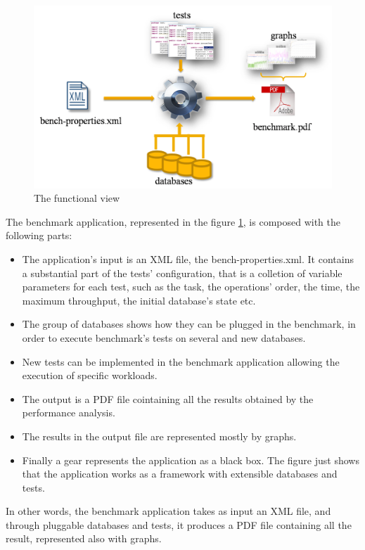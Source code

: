 \begin{figure}[htp!] 
	\begin{center}
		\includegraphics[width=13cm]{img/diagramma-specifiche.png}	
	\end{center}
	\caption{The functional view}
	\label{system-external-view}	
\end{figure}

The benchmark application, represented in the figure \ref{system-external-view}, is composed with the following parts:
\begin{itemize}
	\item The application's input is an XML file, the bench-properties.xml. It contains a substantial part of the tests' configuration, that is a colletion of variable parameters for each test, such as the task, the operations' order, the time, the maximum throughput, the initial database's state etc.
	\item The group of databases shows how they can be plugged in the benchmark, in order to execute benchmark's tests on several and new databases.
	\item New tests can be implemented in the benchmark application allowing the execution of specific workloads. 
	\item The output is a PDF file cointaining all the results obtained by the performance analysis.
	\item The results in the output file are represented mostly by graphs.
	\item Finally a gear represents the application as a black box. The figure just shows that the application works as a framework with extensible databases and tests.
\end{itemize}
In other words, the benchmark application takes as input an XML file, and through pluggable databases and tests, it produces a PDF file containing all the result, represented also with graphs.

